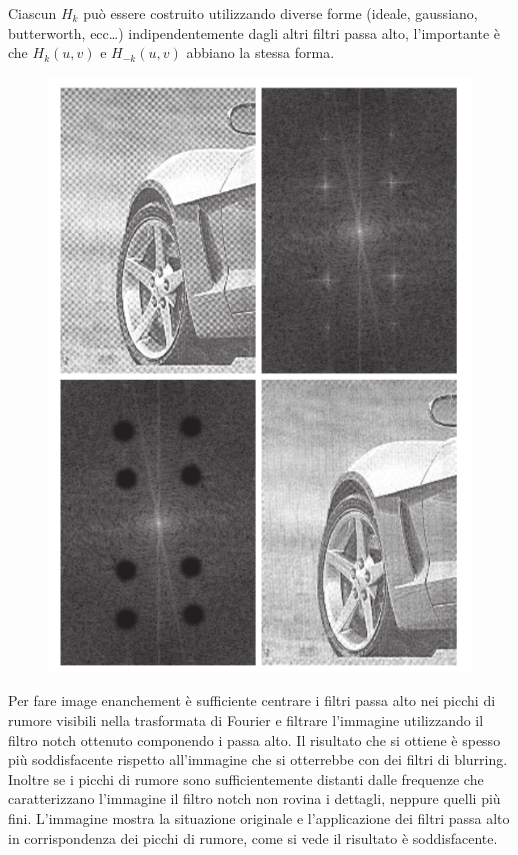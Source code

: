 Ciascun $H_k$ può essere costruito utilizzando diverse forme (ideale, gaussiano, butterworth, ecc\dots) indipendentemente dagli altri filtri passa alto, l'importante è che $H_{k}(u,v)$ e $H_{-k}(u,v)$ abbiano la stessa forma.

\begin{figure}
	\vspace{-.4cm}
	\centering
	\includegraphics[width=.95\linewidth]{Picture/Notch}
\end{figure}
Per fare image enanchement è sufficiente centrare i filtri passa alto nei picchi di rumore visibili nella trasformata di Fourier e filtrare l'immagine utilizzando il filtro notch ottenuto componendo i passa alto. Il risultato che si ottiene è spesso più soddisfacente rispetto all'immagine che si otterrebbe con dei filtri di blurring. Inoltre se i picchi di rumore sono sufficientemente distanti dalle frequenze che caratterizzano l'immagine il filtro notch non rovina i dettagli, neppure quelli più fini. L'immagine mostra la situazione originale e l'applicazione dei filtri passa alto in corrispondenza dei picchi di rumore, come si vede il risultato è soddisfacente.

